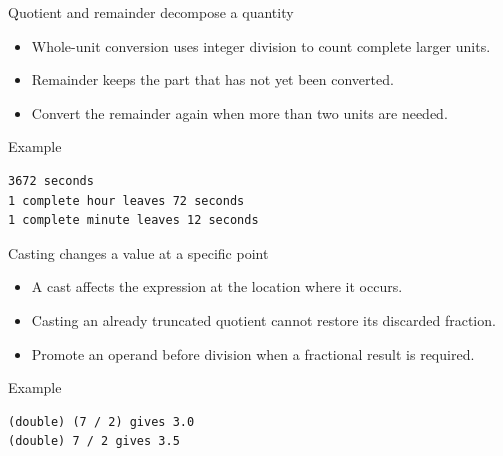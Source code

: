 \documentclass[10pt,aspectratio=169]{beamer}
\begin{document}
\begin{frame}[fragile,t]{Quotient and remainder decompose a quantity}
\begin{itemize}
\item Whole-unit conversion uses integer division to count complete larger units.
\item Remainder keeps the part that has not yet been converted.
\item Convert the remainder again when more than two units are needed.
\end{itemize}
\vspace{1mm}\begin{block}{Example}
\begin{lstlisting}
3672 seconds
1 complete hour leaves 72 seconds
1 complete minute leaves 12 seconds
\end{lstlisting}
\end{block}
\end{frame}

\begin{frame}[fragile,t]{Casting changes a value at a specific point}
\begin{itemize}
\item A cast affects the expression at the location where it occurs.
\item Casting an already truncated quotient cannot restore its discarded fraction.
\item Promote an operand before division when a fractional result is required.
\end{itemize}
\vspace{1mm}\begin{block}{Example}
\begin{lstlisting}
(double) (7 / 2) gives 3.0
(double) 7 / 2 gives 3.5
\end{lstlisting}
\end{block}
\end{frame}
\end{document}
